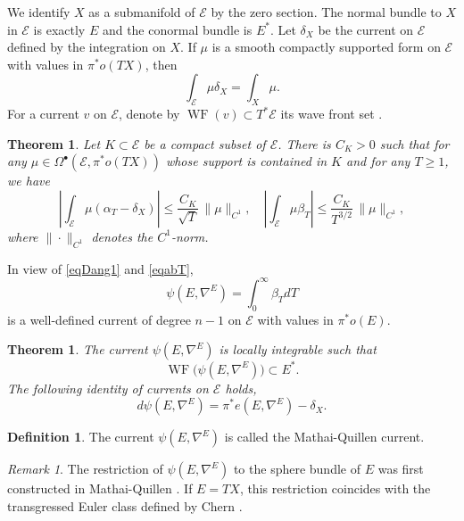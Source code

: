 \documentclass[11pt]{article}
\numberwithin{equation}{section}
\newcommand{\sbullet}{{\scriptscriptstyle\bullet}}
\let\mathcal\mathscr
\theoremstyle{plain}
\newtheorem{thm}[lem]{Theorem}
\theoremstyle{definition}
\newtheorem{defin}[lem]{Definition}
\theoremstyle{remark}
\newtheorem{re}[lem]{Remark}
\newcommand{\cE}{\mathcal{E}}
\DeclareMathOperator{\WF}{WF}
\let\l\leqslant
\let\g\geqslant
\begin{document}
We identify $X$ as a submanifold of $\cE$ by the zero section. The normal bundle
to $X$ in $\cE$ is exactly $E$ and the conormal bundle is $E^{*}$.
Let $\delta_{X}$ be the current on $\cE$ defined by the integration
on $X$. If $\mu$ is a smooth compactly supported form on $\cE$ with
values in $\pi^{*}o(TX)$, then
\begin{equation*}
\int_{\cE}\mu\delta_{X}=\int_{X}\mu.
\end{equation*}
For a current $v$ on $\cE$, denote by $\WF(v)\subset
T^{*}\cE$ its wave front set \cite[\S 8.1]{HormanderBook1}.

\begin{thm}
Let $K\subset
\cE$ be a compact subset of $\cE$. There is $C_{K}>0$ such that for
any $\mu\in
\Omega^{\sbullet}(\cE,\pi^{*}o(TX))$ whose support is contained in $K$
and for any $T\g 1$, we have
\begin{equation}\label{eqabT}
\left| \int_{\cE}\mu(\alpha_{T}-\delta_{X})\right|\l
\frac{C_{K}}{\sqrt{T}}\,\|\mu\|_{C^{1}},\quad\left|\int_{\cE}\mu \beta_{T}\right|\l
\frac{C_{K}}{T^{3/2}}\,\|\mu\|_{C^{1}},
\end{equation}
where $\|{\cdot}\|_{C^1}$ denotes the $C^{1}$-norm.
\end{thm}

In view of \eqref{eqDang1} and \eqref{eqabT},
\begin{equation*}
\psi(E,\nabla^{E})=\int_{0}^{\infty}\beta_{T}dT
\end{equation*}
is a well-defined current of degree $n-1$ on $\cE$ with values in $\pi^{*}o(E)$.

\begin{thm}
The current $\psi(E,\nabla^{E})$ is locally
integrable such that
\begin{equation*}\label{WFphi}
\WF \big(\psi(E,\nabla^{E})\big)\subset E^{*}.
\end{equation*}
The following identity of currents
on $\cE$ holds,
\begin{equation*}
d\psi(E,\nabla^{E})=\pi^{*}e(E,\nabla^{E})-\delta_{X}.
\end{equation*}
\end{thm}

\begin{defin}
The current $\psi(E,\nabla^{E})$ is called the Mathai-Quillen
current.
\end{defin}

\begin{re}
The restriction of $\psi(E,\nabla^{E})$ to the
sphere bundle of $E$
was first constructed in Mathai-Quillen \cite[\S 7]{MathaiQuillen}.
If $E=TX$, this restriction coincides with the transgressed Euler
class defined by Chern \cite{Chern2}.
\end{re}
\end{document}

